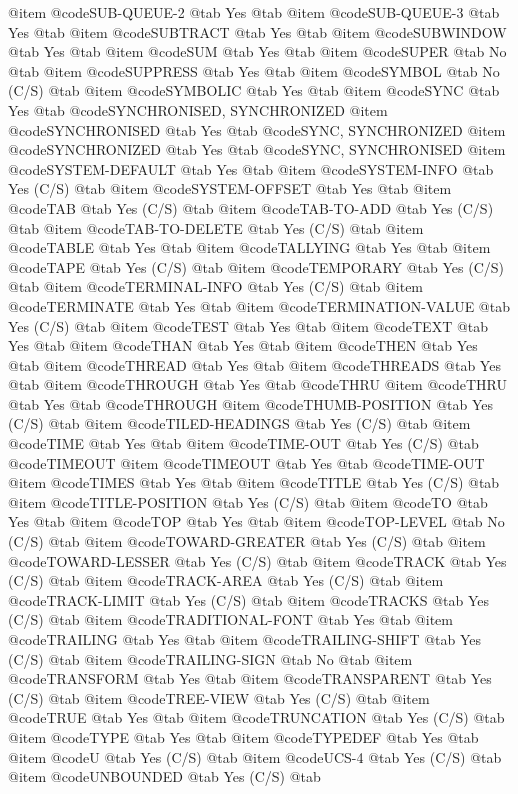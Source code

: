 @item @code{SUB-QUEUE-2} @tab Yes @tab
@item @code{SUB-QUEUE-3} @tab Yes @tab
@item @code{SUBTRACT} @tab Yes @tab
@item @code{SUBWINDOW} @tab Yes @tab
@item @code{SUM} @tab Yes @tab
@item @code{SUPER} @tab No @tab
@item @code{SUPPRESS} @tab Yes @tab
@item @code{SYMBOL} @tab No	(C/S) @tab
@item @code{SYMBOLIC} @tab Yes @tab
@item @code{SYNC} @tab Yes @tab @code{SYNCHRONISED, SYNCHRONIZED}
@item @code{SYNCHRONISED} @tab Yes @tab @code{SYNC, SYNCHRONIZED}
@item @code{SYNCHRONIZED} @tab Yes @tab @code{SYNC, SYNCHRONISED}
@item @code{SYSTEM-DEFAULT} @tab Yes @tab
@item @code{SYSTEM-INFO} @tab Yes	(C/S) @tab
@item @code{SYSTEM-OFFSET} @tab Yes @tab
@item @code{TAB} @tab Yes	(C/S) @tab
@item @code{TAB-TO-ADD} @tab Yes	(C/S) @tab
@item @code{TAB-TO-DELETE} @tab Yes	(C/S) @tab
@item @code{TABLE} @tab Yes @tab
@item @code{TALLYING} @tab Yes @tab
@item @code{TAPE} @tab Yes	(C/S) @tab
@item @code{TEMPORARY} @tab Yes	(C/S) @tab
@item @code{TERMINAL-INFO} @tab Yes	(C/S) @tab
@item @code{TERMINATE} @tab Yes @tab
@item @code{TERMINATION-VALUE} @tab Yes	(C/S) @tab
@item @code{TEST} @tab Yes @tab
@item @code{TEXT} @tab Yes @tab
@item @code{THAN} @tab Yes @tab
@item @code{THEN} @tab Yes @tab
@item @code{THREAD} @tab Yes @tab
@item @code{THREADS} @tab Yes @tab
@item @code{THROUGH} @tab Yes @tab @code{THRU}
@item @code{THRU} @tab Yes @tab @code{THROUGH}
@item @code{THUMB-POSITION} @tab Yes	(C/S) @tab
@item @code{TILED-HEADINGS} @tab Yes	(C/S) @tab
@item @code{TIME} @tab Yes @tab
@item @code{TIME-OUT} @tab Yes	(C/S) @tab @code{TIMEOUT}
@item @code{TIMEOUT} @tab Yes @tab @code{TIME-OUT}
@item @code{TIMES} @tab Yes @tab
@item @code{TITLE} @tab Yes	(C/S) @tab
@item @code{TITLE-POSITION} @tab Yes	(C/S) @tab
@item @code{TO} @tab Yes @tab
@item @code{TOP} @tab Yes @tab
@item @code{TOP-LEVEL} @tab No (C/S) @tab
@item @code{TOWARD-GREATER} @tab Yes	(C/S) @tab
@item @code{TOWARD-LESSER} @tab Yes	(C/S) @tab
@item @code{TRACK} @tab Yes (C/S) @tab
@item @code{TRACK-AREA} @tab Yes (C/S) @tab
@item @code{TRACK-LIMIT} @tab Yes (C/S) @tab
@item @code{TRACKS} @tab Yes (C/S) @tab
@item @code{TRADITIONAL-FONT} @tab Yes @tab
@item @code{TRAILING} @tab Yes @tab
@item @code{TRAILING-SHIFT} @tab Yes	(C/S) @tab
@item @code{TRAILING-SIGN} @tab No @tab
@item @code{TRANSFORM} @tab Yes @tab
@item @code{TRANSPARENT} @tab Yes	(C/S) @tab
@item @code{TREE-VIEW} @tab Yes	(C/S) @tab
@item @code{TRUE} @tab Yes @tab
@item @code{TRUNCATION} @tab Yes	(C/S) @tab
@item @code{TYPE} @tab Yes @tab
@item @code{TYPEDEF} @tab Yes @tab
@item @code{U} @tab Yes	(C/S) @tab
@item @code{UCS-4} @tab Yes	(C/S) @tab
@item @code{UNBOUNDED} @tab Yes	(C/S) @tab

